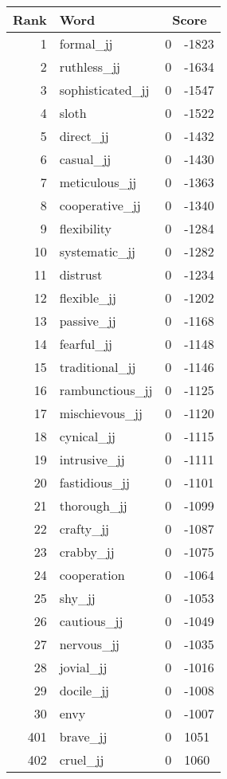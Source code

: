\begin{longtable}[!htbp]{| rlr@{.}l |}
    \hline
    \textbf{Rank} & \textbf{Word} & \multicolumn{2}{c|}{\textbf{Score}} \\
    \hline
    \endhead
    1 & formal\_jj & 0 & -1823 \\
    2 & ruthless\_jj & 0 & -1634 \\
    3 & sophisticated\_jj & 0 & -1547 \\
    4 & sloth & 0 & -1522 \\
    5 & direct\_jj & 0 & -1432 \\
    6 & casual\_jj & 0 & -1430 \\
    7 & meticulous\_jj & 0 & -1363 \\
    8 & cooperative\_jj & 0 & -1340 \\
    9 & flexibility & 0 & -1284 \\
    10 & systematic\_jj & 0 & -1282 \\
    11 & distrust & 0 & -1234 \\
    12 & flexible\_jj & 0 & -1202 \\
    13 & passive\_jj & 0 & -1168 \\
    14 & fearful\_jj & 0 & -1148 \\
    15 & traditional\_jj & 0 & -1146 \\
    16 & rambunctious\_jj & 0 & -1125 \\
    17 & mischievous\_jj & 0 & -1120 \\
    18 & cynical\_jj & 0 & -1115 \\
    19 & intrusive\_jj & 0 & -1111 \\
    20 & fastidious\_jj & 0 & -1101 \\
    21 & thorough\_jj & 0 & -1099 \\
    22 & crafty\_jj & 0 & -1087 \\
    23 & crabby\_jj & 0 & -1075 \\
    24 & cooperation & 0 & -1064 \\
    25 & shy\_jj & 0 & -1053 \\
    26 & cautious\_jj & 0 & -1049 \\
    27 & nervous\_jj & 0 & -1035 \\
    28 & jovial\_jj & 0 & -1016 \\
    29 & docile\_jj & 0 & -1008 \\
    30 & envy & 0 & -1007 \\
    401 & brave\_jj & 0 & 1051 \\
    402 & cruel\_jj & 0 & 1060 \\

\end{longtable}
